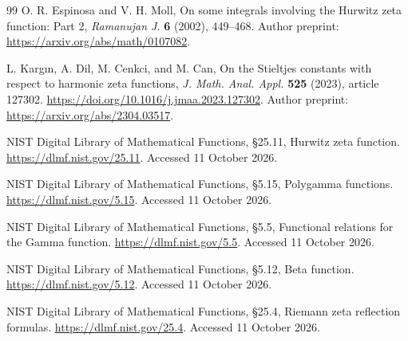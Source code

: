 \begin{thebibliography}{99}
O. R. Espinosa and V. H. Moll,
On some integrals involving the Hurwitz zeta function: Part 2,
\emph{Ramanujan J.} \textbf{6} (2002), 449--468.
Author preprint: \url{https://arxiv.org/abs/math/0107082}.

L. Karg\i n, A. Dil, M. Cenkci, and M. Can,
On the Stieltjes constants with respect to harmonic zeta functions,
\emph{J. Math. Anal. Appl.} \textbf{525} (2023), article 127302.
\url{https://doi.org/10.1016/j.jmaa.2023.127302}.
Author preprint: \url{https://arxiv.org/abs/2304.03517}.




NIST Digital Library of Mathematical Functions,
\S25.11, Hurwitz zeta function.
\url{https://dlmf.nist.gov/25.11}. Accessed 11 October 2026.

NIST Digital Library of Mathematical Functions,
\S5.15, Polygamma functions.
\url{https://dlmf.nist.gov/5.15}. Accessed 11 October 2026.

NIST Digital Library of Mathematical Functions,
\S5.5, Functional relations for the Gamma function.
\url{https://dlmf.nist.gov/5.5}. Accessed 11 October 2026.

NIST Digital Library of Mathematical Functions,
\S5.12, Beta function.
\url{https://dlmf.nist.gov/5.12}. Accessed 11 October 2026.

NIST Digital Library of Mathematical Functions,
\S25.4, Riemann zeta reflection formulas.
\url{https://dlmf.nist.gov/25.4}. Accessed 11 October 2026.
\end{thebibliography}
